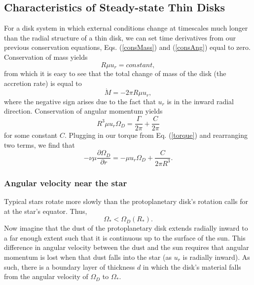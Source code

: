 \documentclass[aps,pra,twocolumn]{revtex4-1}
\begin{document}
\subsection{\label{section 2.2} Characteristics of Steady-state Thin Disks}
For a disk system in which external conditions change at timescales much longer than the radial structure of a thin disk, we can set time derivatives from our previous conservation equations, Eqs. (\ref{consMass}) and (\ref{consAng}) equal to zero.  Conservation of mass yields
\begin{equation}
R\mu u_r = constant, \nonumber
\end{equation}
from which it is easy to see that the total change of mass of the disk (the accretion rate) is equal to 
\begin{equation}
\dot{M} = -2\pi R \mu u_r, \label{modifiedMass1}
\end{equation}
where the negative sign arises due to the fact that $u_r$ is in the inward radial direction.  Conservation of angular momentum yields
\begin{equation}
R^3 \mu u_r \Omega_D = \frac{\Gamma}{2\pi} + \frac{C}{2\pi} \nonumber
\end{equation}
for some constant $C$.  Plugging in our torque from Eq. (\ref{torque}) and rearranging two terms, we find that \cite{king2002}
\begin{equation}
- \nu \mu \frac{\partial \Omega_D}{\partial r} = -\mu u_r \Omega_D  + \frac{C}{2\pi R^3 }. \label{modifiedAng1}
\end{equation}



\subsubsection{\label{section 2.2.1} Angular velocity near the star}
Typical stars rotate more slowly than the protoplanetary disk's rotation calls for at the star's equator.  Thus,
\begin{equation}
\Omega_* < \Omega_D(R_*).
\end{equation}
Now imagine that the dust of the protoplanetary disk extends radially inward to a far enough extent such that it is continuous up to the surface of the sun.  This difference in angular velocity between the dust and the sun requires that angular momentum is lost when that dust falls into the star (as $u_r$ is radially inward).  As such, there is a boundary layer of thickness $d$ in which the disk's material falls from the angular velocity of $\Omega_D$ to $\Omega_*$.  
\end{document}
